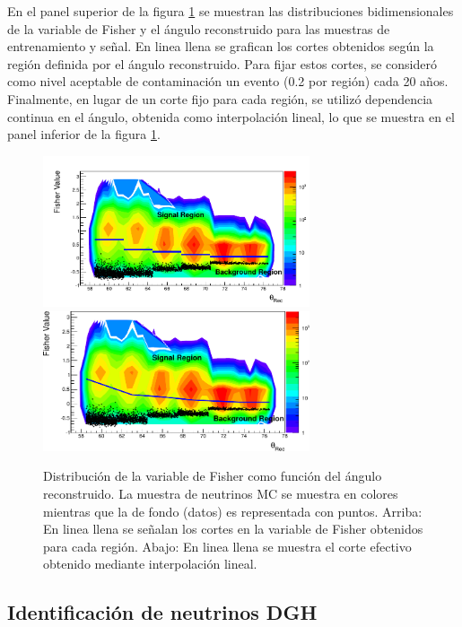 	En el panel superior de la figura \ref{fig:fisher2dDGL} se muestran las distribuciones bidimensionales de la variable de Fisher y el ángulo reconstruido para las muestras de entrenamiento y señal. En linea llena se grafican los cortes obtenidos según la región definida por el ángulo reconstruido.
	Para fijar estos cortes, se consideró como nivel aceptable de contaminación un evento (0.2 por región) cada 20 años.
	Finalmente, en lugar de un corte fijo para cada región, se utilizó dependencia continua en el ángulo, obtenida como interpolación lineal, lo que se muestra en el panel inferior de la figura \ref{fig:fisher2dDGL}.
	\begin{figure}[ht]
	\begin{center}
	\includegraphics[width=0.7\textwidth]{fig/seleccionAuger/fisher2dDGL}\\
	\includegraphics[width=0.7\textwidth]{fig/seleccionAuger/fisher2dInterpolDGL}
	\caption{Distribución de la variable de Fisher como función del ángulo reconstruido. La muestra de neutrinos MC se muestra en colores mientras que la de fondo (datos) es representada con puntos. Arriba: En linea llena se señalan los cortes en la variable de Fisher obtenidos para cada región. Abajo: En linea llena se muestra el corte efectivo obtenido mediante interpolación lineal.}
	\label{fig:fisher2dDGL}
	\end{center}
	\end{figure}
	\clearpage
	
	\subsection{Identificación de neutrinos DGH}
	

